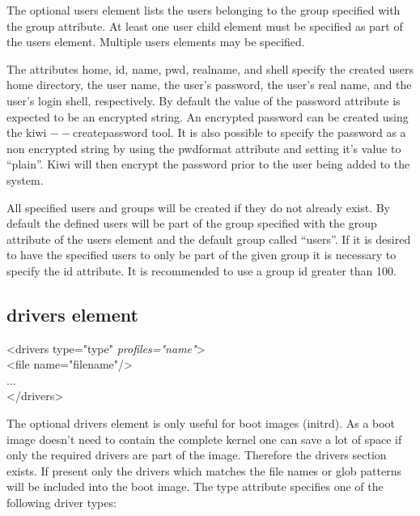 The optional users element lists the users belonging to the group specified
with the group attribute. At least one user child element must be specified
as part of the users element. Multiple users elements may be specified.

The attributes home, id, name, pwd, realname, and shell specify the created
users home directory, the user name, the user's password, the user's 
real name, and the user's login shell, respectively. By default the value
of the password attribute is expected to be an encrypted string. An
encrypted password can be created using the kiwi $--$createpassword tool. It
is also possible to specify the password as a non encrypted string by using
the pwdformat attribute and setting it's value to ``plain''. Kiwi will then
encrypt the password prior to the user being added to the system.

All specified users and groups will be created if they do not already exist.
By default the defined users will be part of the group specified with the 
group attribute of the users element and the default group called ``users''.
If it is desired to have the specified users to only be part of the given
group it is necessary to specify the id attribute. It is recommended to use
a group id greater than 100.

\subsection{drivers element}
\begin{Command}{12cm}
<drivers type="type" \textit{profiles="name"}>\\
\hspace*{1cm}<file name="filename"/>\\
\hspace*{1cm}...\\
</drivers>
\end{Command}

The optional drivers element is only useful for boot images (initrd).
As a boot image doesn't need to contain the complete kernel one can
save a lot of space if only the required drivers are part of the image.
Therefore the drivers section exists. If present only the drivers which
matches the file names or glob patterns will be included into the
boot image. The type attribute specifies one of the following driver
types:

